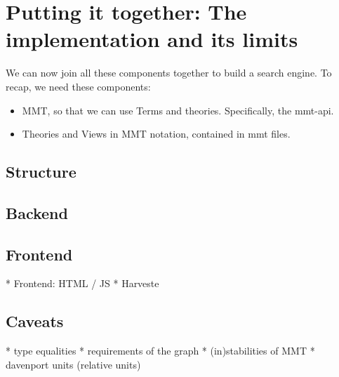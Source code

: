 \section{Putting it together: The implementation and its limits}
\label{sec:pit}

We can now join all these components together to build a search engine. To recap, we need these components:
\begin{itemize}
  \item MMT, so that we can use Terms and theories. Specifically, the mmt-api.
  \item Theories and Views in MMT notation, contained in mmt files. 
\end{itemize}
\subsection{Structure}


\subsection{Backend}
\subsection{Frontend}
\label{sec:frontend}
* Frontend: HTML / JS
* Harveste
\subsection{Caveats}
* type equalities
* requirements of the graph
* (in)stabilities of MMT
* davenport units (relative units)
